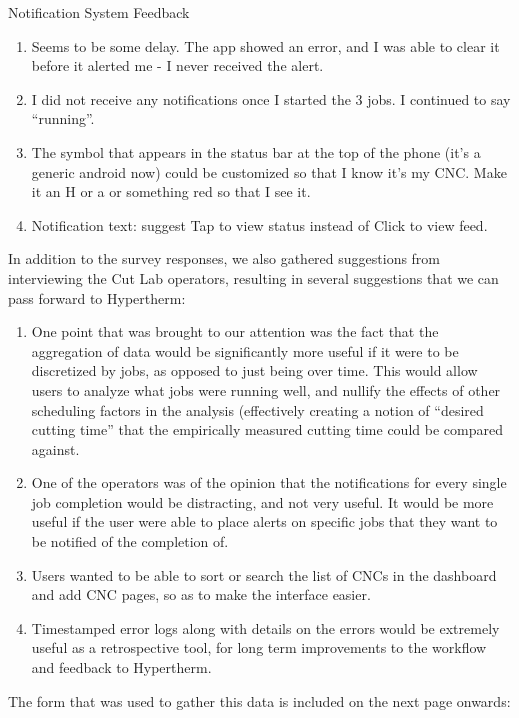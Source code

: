 \documentclass[12pt,letterpaper,titlepage]{article}
\newlength{\wideitemsep}
\let\olditem\item
\renewcommand{\item}{\setlength{\itemsep}{\wideitemsep}\olditem}
\begin{document}
\begin{itemize}
Notification System Feedback
\begin{enumerate}
\item Seems to be some delay. The app showed an error, and I was able to clear it before it alerted me - I never received the alert.
\item I did not receive any notifications once I started the 3 jobs. I continued to say ``running''.
\item The symbol that appears in the status bar at the top of the phone (it’s a generic android now) could be customized so that I know it’s my CNC. Make it an H or a or something red so that I see it.
\item Notification text: suggest Tap to view status instead of Click to view feed.
\end{enumerate}

In addition to the survey responses, we also gathered suggestions from interviewing the Cut Lab operators, resulting in several suggestions that we can pass forward to Hypertherm:

\begin{enumerate}
\item One point that was brought to our attention was the fact that the aggregation of data would be significantly more useful if it were to be discretized by jobs, as opposed to just being over time. This would allow users to analyze what jobs were running well, and nullify the effects of other scheduling factors in the analysis (effectively creating a notion of ``desired cutting time'' that the empirically measured cutting time could be compared against.

\item One of the operators was of the opinion that the notifications for every single job completion would be distracting, and not very useful. It would be more useful if the user were able to place alerts on specific jobs that they want to be notified of the completion of.

\item Users wanted to be able to sort or search the list of CNCs in the dashboard and add CNC pages, so as to make the interface easier.

\item Timestamped error logs along with details on the errors would be extremely useful as a retrospective tool, for long term improvements to the workflow and feedback to Hypertherm.


\end{enumerate}
The form that was used to gather this data is included on the next page onwards:

\end{itemize}
\end{document}
